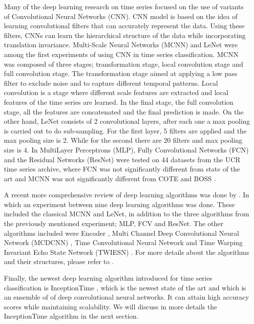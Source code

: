 Many of the deep learning research on time series focused on the use of variants of Convolutional Neural Networks (CNN). \cite{fawaz2019deep}
CNN model is based on the idea of learning convolutional filters that can accurately represent the data. Using these filters, CNNs can learn the hierarchical
structure of the data while incorporating translation invariance\cite{le2016data}.
Multi-Scale Neural Networks (MCNN) \cite{cui2016multi} and LeNet \cite{le2016data} were among the first experiments of using CNN in time series classification.
MCNN was composed of three stages; transformation stage, local convolution stage and full convolution stage. The transformation stage aimed at applying a low pass filter to exclude noise
and to capture different temporal patterns. Local convolution is a stage where different scale features are extracted and local features of the time series are learned.
In the final stage, the full convolution stage, all the features are concatenated and the final prediction is made.
On the other hand, LeNet consists of 2 convolutional layers, after each one a max pooling is carried out to do sub-sampling.
For the first layer, 5 filters are applied and the max pooling size is 2. While for the second there are 20 filters and max pooling size is 4.
In \cite{wang2017time} MultiLayer Perceptrons (MLP), Fully Convolutional Networks (FCN) and the Residual Networks (ResNet) were tested on 44 datasets from the
UCR time series archive, where FCN was not significantly different from state of the art and MCNN was not significantly different from COTE and BOSS \cite{schafer2017fast}.

A recent more comprehensive review of deep learning algorithms was done by \cite{fawaz2019deepreview}.
In which an experiment between nine deep learning algorithms was done.
These included the classical MCNN and LeNet, in addition to the three algorithms from the previously mentioned experiment; MLP, FCV and ResNet.
The other algorithms included were Encoder \cite{serra2018towards}, Multi Channel Deep Convolutional Neural Network (MCDCNN) \cite{zheng2014time,zheng2016exploiting},
Time Convolutional Neural Network \cite{zhao2017convolutional} and Time Warping Invariant Echo State Network (TWIESN) \cite{tanisaro2016time}.
For more details about the algorithms and their structures, please refer to \cite{fawaz2019deepreview}.

Finally, the newest deep learning algorithm introduced for time series classification is InceptionTime \cite{fawaz2020inceptiontime}, which is the newest state of the art
and which is an ensemble of of deep convolutional neural networks. It can attain high accuracy scores while maintaining scalability.
We will discuss in more details the InceptionTime algorithm in the next section.